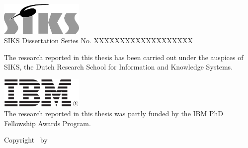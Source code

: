 \thispagestyle{empty}

\begin{addmargin}[-3cm]{1cm}
\vfill

\includegraphics[width=4cm]{front_back_matter/imgs/siks_zw.eps}\\
SIKS Dissertation Series No. XXXXXXXXXXXXXXXXXXX\bigskip
  

\noindent The research reported in this thesis has been carried out under the auspices of SIKS, the Dutch Research School for Information and Knowledge Systems.\bigskip\bigskip

\noindent \includegraphics[width=4cm]{front_back_matter/imgs/ibm.png}\\
The research reported in this thesis was partly funded by the IBM PhD Fellowship Awards Program.\bigskip\bigskip


\vfill
Copyright \textcopyright\ \myTime by \myName
\end{addmargin}